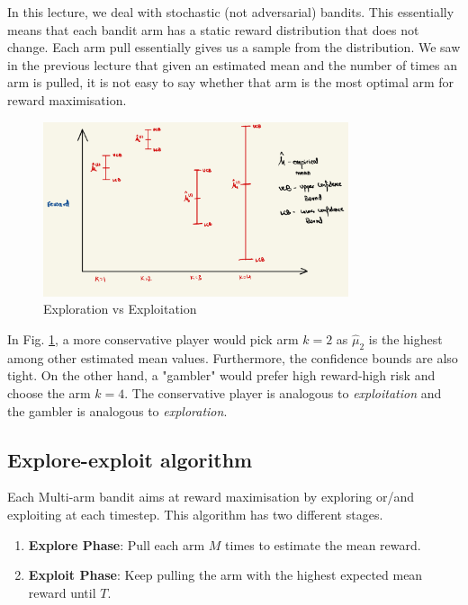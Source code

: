 \documentclass[11pt]{article}
\begin{document}
In this lecture, we deal with stochastic (not adversarial) bandits. This essentially means that each bandit arm has a static reward distribution that does not change. Each arm pull essentially gives us a sample from the distribution. We saw in the previous lecture that given an estimated mean and the number of times an arm is pulled, it is not easy to say whether that arm is the most optimal arm for reward maximisation. 
\begin{figure}[h!]
    \centering
    \includegraphics[width=0.8\textwidth]{IMG_0A1362EF257A-1.jpeg}
    \caption{Exploration vs Exploitation}
    \label{plot}
\end{figure}


In Fig. \ref{plot}, a more conservative player would pick arm $k=2$ as $\hat{\mu}_{2}$ is the highest among other estimated mean values. Furthermore, the confidence bounds are also tight. On the other hand, a "gambler" would prefer high reward-high risk and choose the arm $k=4$. The conservative player is analogous to \textit{exploitation} and the gambler is analogous to \textit{exploration}.

\subsection{Explore-exploit algorithm}
Each Multi-arm bandit aims at reward maximisation by exploring or/and exploiting at each timestep.
This algorithm has two different stages. 
\begin{enumerate}
    \item \textbf{Explore Phase}: Pull each arm $M$ times to estimate the mean reward.
    \item \textbf{Exploit Phase}: Keep pulling the arm with the highest expected mean reward until $T$.
\end{enumerate}
\end{document}
